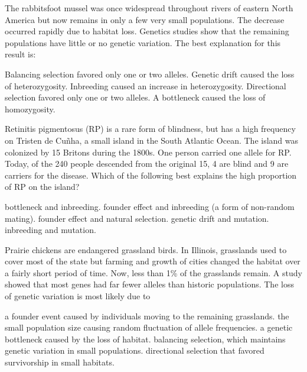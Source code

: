 \newpage

\question
The rabbitsfoot mussel was once widespread throughout rivers of eastern North America but now remains in only a few very small populations. The decrease occurred rapidly due to habitat loss. Genetics studies show that the remaining populations have little or no genetic variation. The best explanation for this result is:

\begin{choices}
	\choice Balancing selection favored only one or two alleles. 
	\correctchoice Genetic drift caused the loss of heterozygosity. 
	\choice Inbreeding caused an increase in heterozygosity. 
	\choice Directional selection favored only one or two alleles. 
	\choice A bottleneck caused the loss of homozygosity. 
\end{choices}

\question
Retinitis pigmentosus (RP) is a rare form of blindness, but has a high frequency on Tristen de Cu\~nha, a small island in the South Atlantic Ocean.  The island was colonized by 15 Britons during the 1800s.  One person carried one allele for RP.  Today, of the 240 people descended from the original 15, 4 are blind and 9 are carriers for the disease.  Which of the following best explains the high proportion of RP on the island?

\begin{choices}
\choice bottleneck and inbreeding.
\correctchoice founder effect and inbreeding (a form of non-random mating).
\choice founder effect and natural selection.
\choice genetic drift and mutation.
\choice inbreeding and mutation.
\end{choices}

\question
Prairie chickens are endangered grassland birds. In Illinois, 
grasslands used to cover most of the state but farming and growth of 
cities changed the habitat over a fairly short period of time. Now, 
less than 1\% of the grasslands remain. A study showed that most genes 
had far fewer alleles than historic populations. The loss of genetic 
variation is most likely due to

\begin{choices}
\choice a founder event caused by individuals moving to the remaining grasslands. 
\choice the small population size causing random fluctuation of allele frequencies. 
\correctchoice a genetic bottleneck caused by the loss of habitat. 
\choice balancing selection, which maintains genetic variation in small populations. 
\choice directional selection that favored survivorship in small habitats. 
\end{choices}


